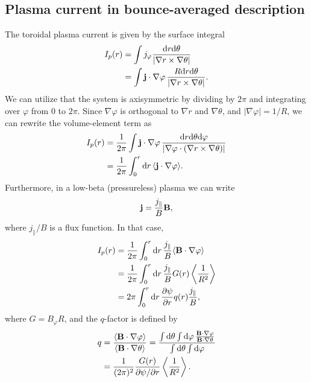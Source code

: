 \documentclass[11pt,a4paper]{article}
\newcommand{\rd}{\ensuremath{\mathrm{d}}}
\renewcommand{\b}[1]{\ensuremath{ {\bf #1 } }}
\begin{document}

\subsection{Plasma current in bounce-averaged description}
The toroidal plasma current is given by the surface integral
\begin{align}
I_p(r) &= \int  j_\varphi \frac{\rd r \rd \theta}{|\nabla r\times\nabla\theta|} \nonumber \\ 
&= \int \b{j}\cdot\nabla \varphi \, \frac{R\rd r \rd \theta}{|\nabla r\times\nabla\theta|} .
\end{align}
We can utilize that the system is axisymmetric by dividing by $2\pi$ and integrating over $\varphi$ from 0 to $2\pi$.
Since $\nabla \varphi$ is orthogonal to $\nabla r$ and $\nabla \theta$, and $|\nabla \varphi| = 1/R$, we can rewrite the volume-element term as
\begin{align}
I_p(r) &= \frac{1}{2\pi} \int \b{j}\cdot\nabla \varphi \, \frac{\rd r \rd \theta \rd\varphi}{|\nabla \varphi \cdot(\nabla r\times\nabla\theta)|}  \nonumber \\
&= \frac{1}{2\pi} \int_0^r \rd r \,\langle \b{j}\cdot\nabla \varphi \rangle.
\end{align}
Furthermore, in a low-beta (pressureless) plasma we can write
\begin{align}
\b{j} = \frac{j_\parallel}{B}\b{B},
\end{align}
where $j_\parallel/B$ is a flux function. In that case,
\begin{align}
I_p(r) &= \frac{1}{2\pi} \int_0^r \rd r \, \frac{j_\parallel}{B} \langle \b{B}\cdot\nabla \varphi \rangle \nonumber \\
&= \frac{1}{2\pi} \int_0^r \rd r\, \frac{j_\parallel}{B} G(r) \left\langle\frac{1}{R^2}\right\rangle \nonumber \\
&= 2\pi  \int_0^r \rd r \,  \frac{\partial \psi}{\partial r}q(r)\frac{j_\parallel}{B} ,
\end{align}
where $G = B_\varphi R$, and the $q$-factor is defined by
\begin{align}
q &= \frac{\langle \b{B}\cdot\nabla \varphi \rangle}{\langle \b{B}\cdot\nabla \theta\rangle} = \frac{\int \rd \theta \int \rd \varphi \, \frac{\b{B}\cdot\nabla\varphi}{\b{B}\cdot\nabla\theta} }{\int \rd \theta \int \rd \varphi} \nonumber \\
&= \frac{1}{(2\pi)^2} \frac{G(r)}{\partial \psi/\partial r} \left\langle\frac{1}{R^2}\right\rangle.
\end{align}
\end{document}
